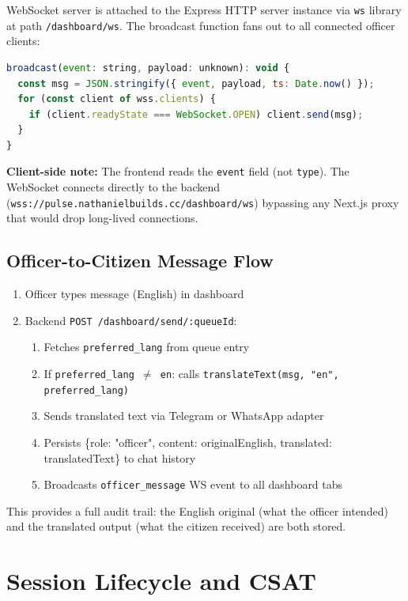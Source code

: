 \documentclass[12pt,a4paper]{article}
\begin{document}
WebSocket server is attached to the Express HTTP server instance via \texttt{ws} library
at path \texttt{/dashboard/ws}. The broadcast function fans out to all connected officer
clients:

\begin{lstlisting}[language=JavaScript]
broadcast(event: string, payload: unknown): void {
  const msg = JSON.stringify({ event, payload, ts: Date.now() });
  for (const client of wss.clients) {
    if (client.readyState === WebSocket.OPEN) client.send(msg);
  }
}
\end{lstlisting}

\textbf{Client-side note:} The frontend reads the \texttt{event} field (not \texttt{type}).
The WebSocket connects directly to the backend (\texttt{wss://pulse.nathanielbuilds.cc/dashboard/ws})
bypassing any Next.js proxy that would drop long-lived connections.

\subsection{Officer-to-Citizen Message Flow}

\begin{enumerate}[noitemsep]
  \item Officer types message (English) in dashboard
  \item Backend \texttt{POST /dashboard/send/:queueId}:
    \begin{enumerate}[noitemsep]
      \item Fetches \texttt{preferred\_lang} from queue entry
      \item If \texttt{preferred\_lang $\neq$ en}: calls \texttt{translateText(msg, "en", preferred\_lang)}
      \item Sends translated text via Telegram or WhatsApp adapter
      \item Persists \{role: "officer", content: originalEnglish, translated: translatedText\} to chat history
      \item Broadcasts \texttt{officer\_message} WS event to all dashboard tabs
    \end{enumerate}
\end{enumerate}

This provides a full audit trail: the English original (what the officer intended)
and the translated output (what the citizen received) are both stored.

\section{Session Lifecycle and CSAT}
\label{sec:session}
\end{document}
